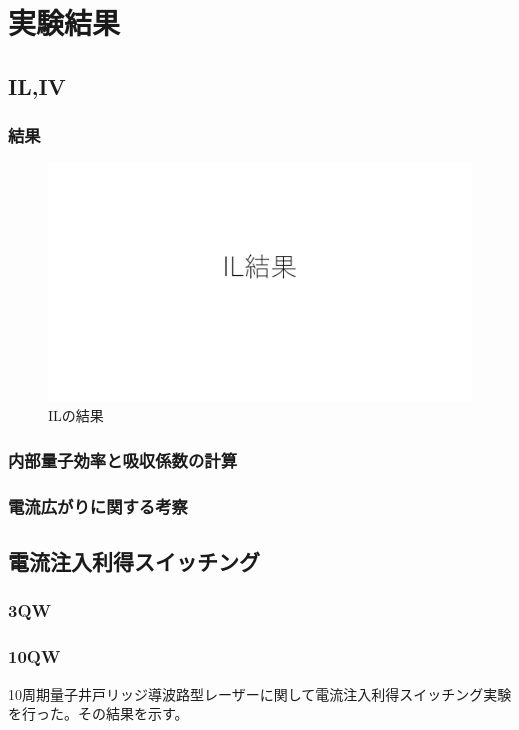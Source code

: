 \chapter{実験結果}
\section{IL,IV}
\subsection{結果}
\begin{figure}[htbp]
	\includegraphics[width=15cm]{figure/fig_IL_result.pdf}
	\caption{ILの結果}
	\label{fig:IL_result}
\end{figure}
\subsection{内部量子効率と吸収係数の計算}
\subsection{電流広がりに関する考察}
\section{電流注入利得スイッチング}
\subsection{3QW}
\subsection{10QW}
10周期量子井戸リッジ導波路型レーザーに関して電流注入利得スイッチング実験を行った。その結果を示す。



